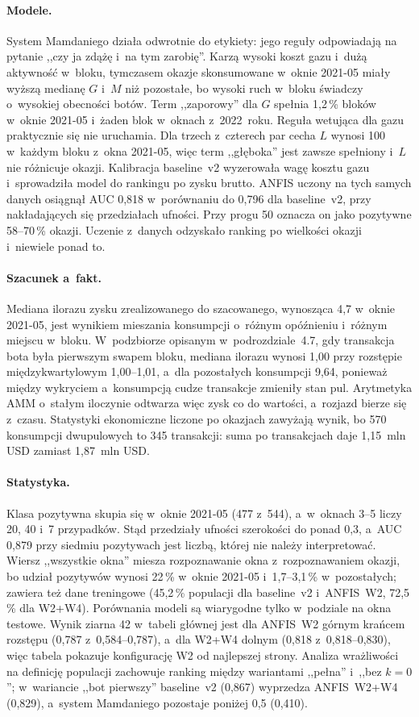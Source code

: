 \paragraph{Modele.} System Mamdaniego działa odwrotnie do etykiety: jego reguły odpowiadają na
pytanie ,,czy ja zdążę i~na tym zarobię''. Karzą wysoki koszt gazu i~dużą aktywność w~bloku,
tymczasem okazje skonsumowane w~oknie 2021-05 miały wyższą medianę $G$ i~$M$ niż pozostałe, bo
wysoki ruch w~bloku świadczy o~wysokiej obecności botów. Term ,,zaporowy'' dla $G$ spełnia
1,2\,\% bloków w~oknie 2021-05 i~żaden blok w~oknach z~2022~roku. Reguła wetująca dla gazu
praktycznie się nie uruchamia. Dla trzech z~czterech par cecha $L$ wynosi 100 w~każdym bloku
z~okna 2021-05, więc term ,,głęboka'' jest zawsze spełniony i~$L$ nie różnicuje okazji.
Kalibracja baseline~v2 wyzerowała wagę kosztu gazu i~sprowadziła model do rankingu po zysku
brutto. ANFIS uczony na tych samych danych osiągnął AUC 0,818 w~porównaniu do 0,796 dla
baseline~v2, przy nakładających się przedziałach ufności. Przy progu 50 oznacza on jako pozytywne
58--70\,\% okazji. Uczenie z~danych odzyskało ranking po wielkości okazji i~niewiele ponad to.

\paragraph{Szacunek a~fakt.} Mediana ilorazu zysku zrealizowanego do szacowanego, wynosząca 4,7
w~oknie 2021-05, jest wynikiem mieszania konsumpcji o~różnym opóźnieniu i~różnym miejscu
w~bloku. W~podzbiorze opisanym w~podrozdziale~4.7, gdy transakcja bota była pierwszym swapem
bloku, mediana ilorazu wynosi 1,00 przy rozstępie międzykwartylowym 1,00--1,01, a~dla pozostałych
konsumpcji 9,64, ponieważ między wykryciem a~konsumpcją cudze transakcje zmieniły stan pul.
Arytmetyka AMM o~stałym iloczynie odtwarza więc zysk co do wartości, a~rozjazd bierze się z~czasu.
Statystyki ekonomiczne liczone po okazjach zawyżają wynik, bo 570 konsumpcji dwupulowych to 345
transakcji: suma po transakcjach daje 1,15~mln USD zamiast 1,87~mln USD.

\paragraph{Statystyka.} Klasa pozytywna skupia się w~oknie 2021-05 (477 z~544), a~w~oknach 3--5
liczy 20, 40 i~7 przypadków. Stąd przedziały ufności szerokości do ponad 0,3, a~AUC 0,879 przy
siedmiu pozytywach jest liczbą, której nie należy interpretować. Wiersz ,,wszystkie okna'' miesza
rozpoznawanie okna z~rozpoznawaniem okazji, bo udział pozytywów wynosi 22\,\% w~oknie 2021-05
i~1,7--3,1\,\% w~pozostałych; zawiera też dane treningowe (45,2\,\% populacji dla baseline~v2
i~ANFIS~W2, 72,5\,\% dla W2+W4). Porównania modeli są wiarygodne tylko w~podziale na okna
testowe. Wynik ziarna 42 w~tabeli głównej jest dla ANFIS~W2 górnym krańcem rozstępu
(0,787 z~0,584--0,787), a~dla W2+W4 dolnym (0,818 z~0,818--0,830), więc tabela pokazuje
konfigurację W2 od najlepszej strony. Analiza wrażliwości na definicję populacji zachowuje ranking
między wariantami ,,pełna'' i~,,bez $k=0$''; w~wariancie ,,bot pierwszy'' baseline~v2 (0,867)
wyprzedza ANFIS~W2+W4 (0,829), a~system Mamdaniego pozostaje poniżej 0,5 (0,410).

